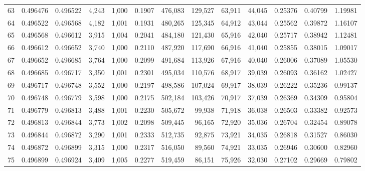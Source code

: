 \begin{tabular}{rrrrrrrrrrrrr}
63  &  0.496476 &  0.496522 &   4,243 &  1,000 &                                     0.1907 &  476,083 &  129,527 &   63,911 &   44,045 &  0.25376 &  0.40799 &  1.19981 \\
64  &  0.496522 &  0.496568 &   4,182 &  1,001 &                                     0.1931 &  480,265 &  125,345 &   64,912 &   43,044 &  0.25562 &  0.39872 &  1.16107 \\
65  &  0.496568 &  0.496612 &   3,915 &  1,004 &                                     0.2041 &  484,180 &  121,430 &   65,916 &   42,040 &  0.25717 &  0.38942 &  1.12481 \\
66  &  0.496612 &  0.496652 &   3,740 &  1,000 &                                     0.2110 &  487,920 &  117,690 &   66,916 &   41,040 &  0.25855 &  0.38015 &  1.09017 \\
67  &  0.496652 &  0.496685 &   3,764 &  1,000 &                                     0.2099 &  491,684 &  113,926 &   67,916 &   40,040 &  0.26006 &  0.37089 &  1.05530 \\
68  &  0.496685 &  0.496717 &   3,350 &  1,001 &                                     0.2301 &  495,034 &  110,576 &   68,917 &   39,039 &  0.26093 &  0.36162 &  1.02427 \\
69  &  0.496717 &  0.496748 &   3,552 &  1,000 &                                     0.2197 &  498,586 &  107,024 &   69,917 &   38,039 &  0.26222 &  0.35236 &  0.99137 \\
70  &  0.496748 &  0.496779 &   3,598 &  1,000 &                                     0.2175 &  502,184 &  103,426 &   70,917 &   37,039 &  0.26369 &  0.34309 &  0.95804 \\
71  &  0.496779 &  0.496813 &   3,488 &  1,001 &                                     0.2230 &  505,672 &   99,938 &   71,918 &   36,038 &  0.26503 &  0.33382 &  0.92573 \\
72  &  0.496813 &  0.496844 &   3,773 &  1,002 &                                     0.2098 &  509,445 &   96,165 &   72,920 &   35,036 &  0.26704 &  0.32454 &  0.89078 \\
73  &  0.496844 &  0.496872 &   3,290 &  1,001 &                                     0.2333 &  512,735 &   92,875 &   73,921 &   34,035 &  0.26818 &  0.31527 &  0.86030 \\
74  &  0.496872 &  0.496899 &   3,315 &  1,000 &                                     0.2317 &  516,050 &   89,560 &   74,921 &   33,035 &  0.26946 &  0.30600 &  0.82960 \\
75  &  0.496899 &  0.496924 &   3,409 &  1,005 &                                     0.2277 &  519,459 &   86,151 &   75,926 &   32,030 &  0.27102 &  0.29669 &  0.79802 \\

\end{tabular}
